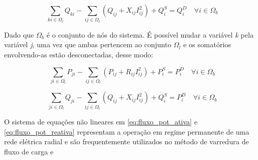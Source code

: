 \begin{equation*}
    \sum_{ki\in\Omega_{l}}Q_{ki} - \sum_{ij\in\Omega_{l}}(Q_{ij} + X_{ij}I_{ij}^{2}) + Q_{i}^{S} = Q_{i}^{D}\quad\forall i \in\Omega_{b}
\end{equation*}

Dado que $\Omega_{b}$ é o conjunto de nós do sistema.
É possível mudar a variável \textit{k} pela variável \textit{j}, uma vez que ambas pertencem ao conjunto $\Omega_{l}$ e os somatórios envolvendo-as estão desconectadas, desse modo:

\begin{equation}
    \sum_{ji\in\Omega_{l}}P_{ji} - \sum_{ij\in\Omega_{l}}(P_{ij} + R_{ij}I_{ij}^{2}) + P_{i}^{S} = P_{i}^{D}\quad\forall i \in\Omega_{b}\label{eq:fluxo_pot_ativa}  
\end{equation}


\begin{equation}
    \sum_{ji\in\Omega_{l}}Q_{ji} - \sum_{ij\in\Omega_{l}}(Q_{ij} + X_{ij}I_{ij}^{2}) + Q_{i}^{S} = P_{i}^{D}\quad\forall i \in\Omega_{b}\label{eq:fluxo_pot_reativa}
\end{equation}

O sistema de equações não lineares em \ref{eq:fluxo_pot_ativa} e \ref{eq:fluxo_pot_reativa} representam a operação em regime permanente de uma rede elétrica radial e são frequentemente utilizados no método de varredura de fluxo de carga \cite{Shirmohammadi1988ANetworks} e \cite{Cespedes1990NewNetworks}